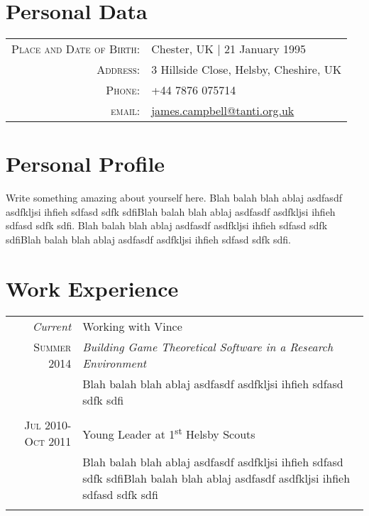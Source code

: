 \documentclass[a4paper, 11pt]{article}
\begin{document}
\pagestyle{empty} %
\par{
\section{Personal Data}

\begin{tabular}{rl}

\textsc{Place and Date of Birth:} & Chester, UK  | 21 January 1995 \\
\textsc{Address:} & 3 Hillside Close, Helsby, Cheshire, UK \\
\textsc{Phone:} & +44 7876 075714\\
\textsc{email:} & \href{mailto:james.campbell@tanti.org.uk}{james.campbell@tanti.org.uk}

\end{tabular}
\section{Personal Profile}
\begin{flushleft}
Write something amazing about yourself here. Blah balah blah ablaj asdfasdf asdfkljsi ihfieh sdfasd sdfk sdfiBlah balah blah ablaj asdfasdf asdfkljsi ihfieh sdfasd sdfk sdfi. Blah balah blah ablaj asdfasdf asdfkljsi ihfieh sdfasd sdfk sdfiBlah balah blah ablaj asdfasdf asdfkljsi ihfieh sdfasd sdfk sdfi.
\end{flushleft}
\section{Work Experience}
\begin{tabular}{r|p{11cm}}

\emph{Current} & Working with Vince \\
\textsc{Summer 2014} & \emph{Building Game Theoretical Software in a Research Environment}\\
& \footnotesize{Blah balah blah ablaj asdfasdf asdfkljsi ihfieh sdfasd sdfk sdfi}\\
\\
\textsc{Jul 2010-Oct 2011} & Young Leader at 1\textsuperscript{st} Helsby Scouts\\
& \footnotesize{Blah balah blah ablaj asdfasdf asdfkljsi ihfieh sdfasd sdfk sdfiBlah balah blah ablaj asdfasdf asdfkljsi ihfieh sdfasd sdfk sdfi}\\
\\


\end{tabular}}
\end{document}
